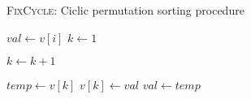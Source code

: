 \begin{algorithm}[H]
\caption{\textsc{FixCycle}: Ciclic permutation sorting procedure}
\label{alg:fix_cycle}      
\begin{algorithmic}[1]
    \State $val \gets v[i]$
	\Do
		\State $k \leftarrow 1$
		
				\State $k \leftarrow k + 1$
			\EndIf
		\EndFor
		
		\State $temp \leftarrow v[k]$
		\State $v[k] \leftarrow val$
		\State $val \gets temp$
\EndProcedure
\end{algorithmic}
\end{algorithm}